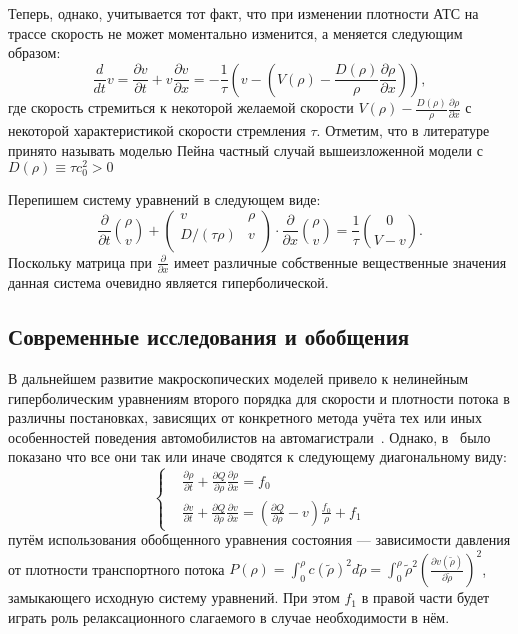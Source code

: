 Теперь, однако, учитывается тот факт, что при изменении плотности АТС на трассе скорость не может моментально изменится, а меняется следующим образом:
\[
\frac{d}{dt}v = \frac{\partial v}{\partial t} + v \frac{\partial v}{\partial x} = -\frac{1}{\tau} \left(v - \left(V(\rho) - \frac{D(\rho)}{\rho}\frac{\partial\rho}{\partial x}\right)\right),
\]
где скорость стремиться к некоторой желаемой скорости \( V(\rho) - \frac{D(\rho)}{\rho}\frac{\partial\rho}{\partial x}\) с некоторой характеристикой скорости стремления \(\tau\).
Отметим, что в литературе принято называть моделью Пейна частный случай вышеизложенной модели с \(D(\rho)\equiv\tau c_0^2 > 0\)

Перепишем систему уравнений в следующем виде:
\begin{equation}
    \label{eq:equation5}
  \frac{\partial}{\partial t}\binom{\rho}{v} +
  \left(
        \begin{array}{cc}
            v  & \rho \\
            D/(\tau\rho)  & v \\
        \end{array}
    \right)\cdot \frac{\partial}{\partial x} \binom{\rho}{v} = \frac{1}{\tau}\binom{0}{V-v}.
\end{equation}
Поскольку матрица при \(\frac{\partial}{\partial x}\) имеет различные собственные вещественные значения данная система очевидно является гиперболической.


\subsection{Современные исследования и обобщения}\label{subsec:ch1/sec1/sub5}
В дальнейшем развитие макроскопических моделей привело к нелинейным гиперболическим уравнениям второго порядка для скорости и плотности потока в различны постановках, зависящих от конкретного метода учёта тех или иных особенностей поведения автомобилистов на автомагистрали~\cite{payne1971model,daganzo1995requiem,papageorgiou1998some,zhang2002non,zhang2003anisotropic,siebel2006fundamental}.
Однако, в~\cite{collectiveArticle} было показано что все они так или иначе сводятся к следующему диагональному виду:
\[
\left\{
\begin{array}{rl}
  &\frac{\partial\rho}{\partial t} + \frac{\partial Q}{\partial\rho}\frac{\partial\rho}{\partial x} = f_0 \\
  &\frac{\partial v}{\partial t} + \frac{\partial Q}{\partial\rho}\frac{\partial v}{\partial x} = (\frac{\partial Q}{\partial\rho} - v) \frac{f_0}{\rho} + f_1
\end{array}
\right.
\]
путём использования обобщенного уравнения состояния --- зависимости давления от плотности транспортного потока \(P(\rho) = \int_{0}^{\rho} c(\tilde{\rho})^2 d\tilde{\rho} = \int_{0}^{\rho} \tilde{\rho}^2 (\frac{\partial v(\tilde{\rho})}{\partial \tilde{\rho}})^2\),
замыкающего исходную систему уравнений.
При этом \(f_1\) в правой части будет играть роль релаксационного слагаемого в случае необходимости в нём.

